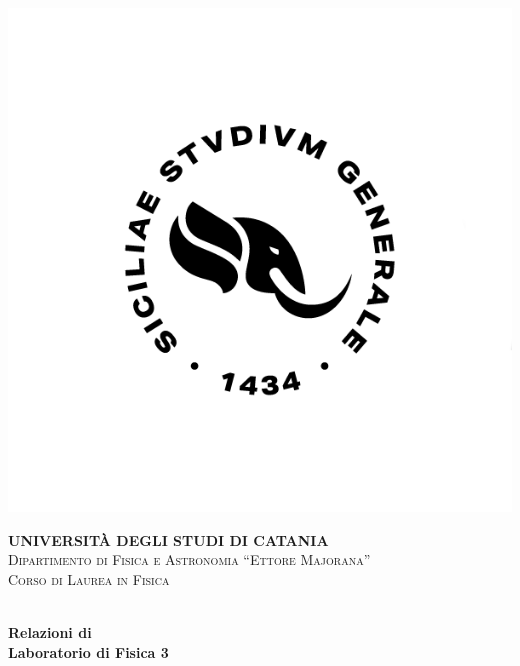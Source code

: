 \begin{titlingpage}
    \begin{center}
        \begin{minipage}[h!]{\linewidth}
            \begin{minipage}[ht!]{\linewidth}
                \centering
                \includegraphics[width=\unictsize]{images/UniCT-Logo-Nero-quadrato.png}
            \end{minipage}
            \centering\large
            \textbf{UNIVERSITÀ DEGLI STUDI DI CATANIA}
            \\[5pt]
            \normalsize
            \textsc{Dipartimento di Fisica e Astronomia ``Ettore Majorana''}
            \\[5pt]
            \textsc{Corso di Laurea in Fisica}
            \\[10pt]
            \doublerule
        \end{minipage}
        \\[50pt]
        \vspace{\fill}
        {\huge\bfseries Relazioni di\\Laboratorio di Fisica 3\\}

\end{center}
\end{titlingpage}
